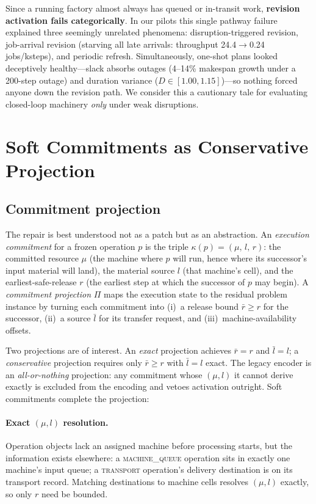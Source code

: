 \documentclass[twocolumn]{article}
\begin{document}
Since a running factory almost always has queued or in-transit work,
\textbf{revision activation fails categorically}. In our pilots this
single pathway failure explained three seemingly unrelated phenomena:
disruption-triggered revision, job-arrival revision (starving all late
arrivals: throughput 24.4$\to$0.24 jobs/ksteps), and periodic refresh.
Simultaneously, one-shot plans looked deceptively healthy---slack absorbs
outages (4--14\% makespan growth under a 200-step outage) and duration
variance ($D\in[1.00,1.15]$)---so nothing forced anyone down the
revision path. We consider this a cautionary tale for evaluating
closed-loop machinery \emph{only} under weak disruptions.

\section{Soft Commitments as Conservative Projection}
\label{sec:soft}

\subsection{Commitment projection}
The repair is best understood not as a patch but as an abstraction.
An \emph{execution commitment} for a frozen operation $p$ is the triple
$\kappa(p)=(\mu,\,l,\,r)$: the committed resource $\mu$ (the machine
where $p$ will run, hence where its successor's input material will
land), the material source $l$ (that machine's cell), and the
earliest-safe-release $r$ (the earliest step at which the successor of
$p$ may begin). A \emph{commitment projection}
$\Pi$ maps the execution state to the residual problem instance by
turning each commitment into (i)~a release bound $\bar r\ge r$ for the
successor, (ii)~a source $\bar l$ for its transfer request, and
(iii)~machine-availability offsets.

Two projections are of interest. An \emph{exact} projection achieves
$\bar r=r$ and $\bar l=l$; a \emph{conservative} projection requires only
$\bar r\ge r$ with $\bar l=l$ exact. The legacy encoder is an
\emph{all-or-nothing} projection: any commitment whose $(\mu,l)$ it
cannot derive exactly is excluded from the encoding and vetoes
activation outright. Soft commitments complete the projection:

\paragraph{Exact $(\mu,l)$ resolution.}
Operation objects lack an assigned machine before processing starts,
but the information exists elsewhere: a \textsc{machine\_queue}
operation sits in exactly one machine's input queue; a
\textsc{transport} operation's delivery destination is on its transport
record. Matching destinations to machine cells resolves $(\mu,l)$
exactly, so only $r$ need be bounded.
\end{document}
